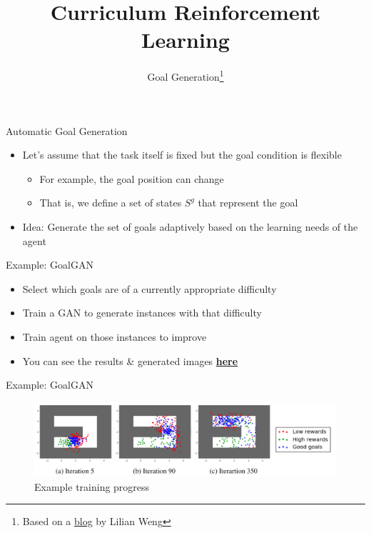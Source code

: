 \documentclass[aspectratio=169]{../latex_main/tntbeamer}  %
\title[Curriculum RL]{Curriculum Reinforcement Learning}
\subtitle{Goal Generation\footnote{Based on a \href{https://lilianweng.github.io/lil-log/2020/01/29/curriculum-for-reinforcement-learning.html}{blog} by Lilian Weng}}
\begin{document}
	
	\maketitle

\begin{frame}[c]{Automatic Goal Generation}
	
	\begin{itemize}
		\item Let's assume that the task itself is fixed but the goal condition is flexible
		\begin{itemize}
			\item For example, the goal position can change
			\item That is, we define a set of states $S^g$ that represent the goal
		\end{itemize}
		\pause
		\smallskip
		\item \alert{Idea:} Generate the set of goals adaptively based on the learning needs of the agent
	\end{itemize}
	
\end{frame}
\begin{frame}[c]{Example: GoalGAN }
	
	\begin{itemize}
		\item Select which goals are of a currently appropriate difficulty
		\item Train a GAN to generate instances with that difficulty
		\item Train agent on those instances to improve
		\item You can see the results \& generated images \href{https://sites.google.com/view/goalgeneration4rl}{\textbf{here}}
	\end{itemize}
	
\end{frame}
\begin{frame}[c]{Example: GoalGAN }
	
	\begin{figure}
		\centering
		\includegraphics[scale=0.37]{images/goalgan.png}
		\caption{Example training progress}
	\end{figure}
	
\end{frame}
\end{document}
